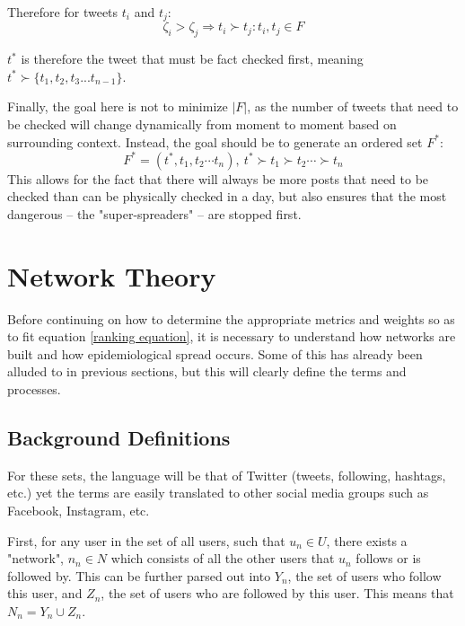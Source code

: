\documentclass[preprint,review,12pt]{elsarticle}
\begin{document}
 Therefore for tweets $t_i$ and $t_j$: 
  \begin{equation}
  \label{ranking equation}
      \zeta_i > \zeta_j \Rightarrow t_i \succ t_j : t_i, t_j \in F
  \end{equation}
  
  $t^*$ is therefore the tweet that must be fact checked first, meaning  $t^* \succ \{t_1, t_2, t_3 ... t_{n-1}\}$. 
  
  Finally, the goal here is not to minimize $|F|$, as the number of tweets that need to be checked will change dynamically from moment to moment based on surrounding context. Instead, the goal should be to generate an ordered set $F^*$:
  \begin{equation}
      F^* = (t^*, t_1, t_2 \cdots t_n), \ t^* \succ t_1 \succ t_2 \cdots \succ t_n
  \end{equation}
  This allows for the fact that there will always be more posts that need to be checked than can be physically checked in a day, but also ensures that the most dangerous -- the "super-spreaders" -- are stopped first.
  


\section{Network Theory}
\label{sec: Background Definitions}
Before continuing on how to determine the appropriate metrics and weights so as to fit equation \ref{ranking equation}, it is necessary to understand how networks are built and how epidemiological spread occurs. Some of this has already been alluded to in previous sections, but this will clearly define the terms and processes.

\subsection{Background Definitions}
For these sets, the language will be that of Twitter (tweets, following, hashtags, etc.) yet the terms are easily translated to other social media groups such as Facebook, Instagram, etc.

First, for any user in the set of all users, such that $u_n \in U$, there exists a "network", $n_n \in N$ which consists of all the other users that $u_n$ follows or is followed by. This can be further parsed out into $Y_n$, the set of users who follow this user, and $Z_n$, the set of users who are followed by this user. This means that  $N_n = Y_n \cup Z_n$. 
\end{document}

